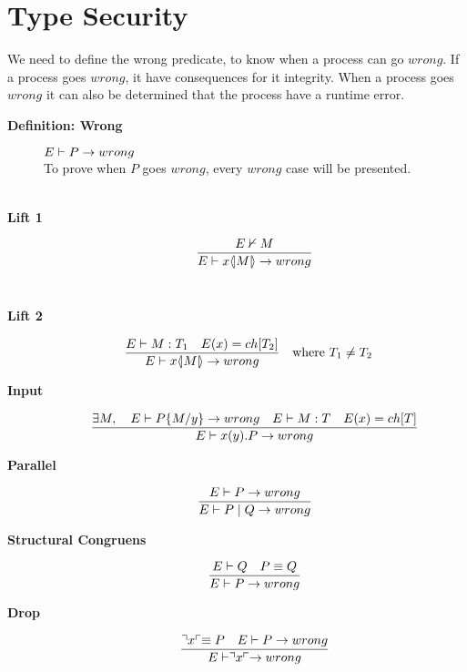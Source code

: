 \section{Type Security}

We need to define the wrong predicate, to know when a process can go \ensuremath{wrong}. If a process goes \ensuremath{wrong}, it have consequences for it integrity. When a process goes \ensuremath{wrong} it can also be determined that the process have a runtime error.
\begin{description}
    \item[\textbf{Definition: Wrong}]
    \ensuremath{E \vdash P \ra wrong} \\
    
    To prove when \ensuremath{P} goes \ensuremath{wrong}, every \ensuremath{wrong} case will be presented.\\\\
    \item[\textbf{Lift 1}] \begin{align*}
        \frac{E \nvdash M}{E \vdash x \langle \! | M | \! \rangle \rightarrow wrong}
    \end{align*}\\
        
    \item[\textbf{Lift 2}] \begin{align*}
            \frac{E \vdash M:T_1 \quad E(x)=ch[T_2]}{E \vdash x \langle \! | M | \! \rangle \rightarrow wrong} &\quad \text{where}\ T_1 \neq T_2
    \end{align*}

    \item[\textbf{Input}] \begin{align*}
        \frac{\exists M,\quad E \vdash P\{ M/ y\} \rightarrow wrong \quad E \vdash M:T \quad E(x)= ch[T]} {E \vdash x(y).P \rightarrow wrong}\\
    \end{align*}

    \item[\textbf{Parallel}] \begin{align*}
        \frac{E \vdash P \rightarrow wrong}{E \vdash P \mid Q \rightarrow wrong}
    \end{align*}

    \item[\textbf{Structural Congruens}] \begin{align*}
        \frac{E \vdash Q \quad P \equiv Q}{E \vdash P \rightarrow wrong}
    \end{align*}

    \item[\textbf{Drop}]\begin{align*}
        \frac{\urcorner x \ulcorner \equiv P \quad E \vdash P \rightarrow wrong}{E \vdash \urcorner x \ulcorner \rightarrow wrong}
    \end{align*}


\end{description}
